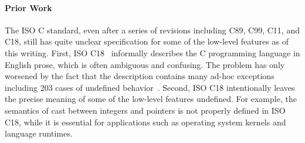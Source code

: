












\paragraph{Prior Work}

The ISO C standard, even after a series of revisions including C89, C99, C11, and C18, still has
quite unclear specification for some of the low-level features as of this writing.  First, ISO
C18~\cite{c18} informally describes the C programming language in English prose, which is often
ambiguous and confusing.  The problem has only worsened by the fact that the description contains
many ad-hoc exceptions including 203 cases of undefined behavior~\cite[J.2]{c18}.  Second, ISO C18
intentionally leaves the precise meaning of some of the low-level features undefined.  For example,
the semantics of cast between integers and pointers is not properly defined in ISO C18, while it is
essential for applications such as operating system kernels and language runtimes.

